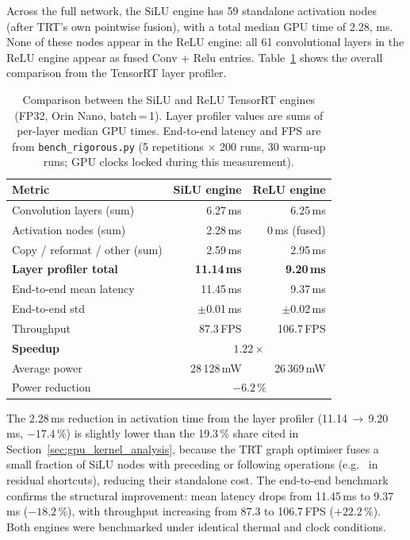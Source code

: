 \documentclass[12pt,a4paper]{report}
\begin{document}
\noindent Across the full network, the SiLU engine has 59 standalone activation nodes
(after TRT's own pointwise fusion), with a total median GPU time of 2.28, ms.
None of these nodes appear in the ReLU engine: all 61 convolutional layers in the ReLU
engine appear as fused Conv + Relu entries.
Table~\ref{tab:silu_relu} shows the overall comparison from the TensorRT layer profiler.

\begin{table}[h]
\centering
\caption{Comparison between the SiLU and ReLU TensorRT engines (FP32, Orin Nano,
batch\,=\,1). Layer profiler values are sums of per-layer median GPU times.
End-to-end latency and FPS are from \texttt{bench\_rigorous.py}
(5 repetitions $\times$ 200 runs, 30 warm-up runs;
GPU clocks locked during this measurement).}
\label{tab:silu_relu}
\begin{tabular}{lrr}
\toprule
Metric & SiLU engine & ReLU engine \\
\midrule
Convolution layers (sum)          & 6.27\,ms           & 6.25\,ms          \\
Activation nodes (sum)            & 2.28\,ms           & 0\,ms (fused)     \\
Copy / reformat / other (sum)     & 2.59\,ms           & 2.95\,ms          \\
\midrule
\textbf{Layer profiler total}     & \textbf{11.14\,ms} & \textbf{9.20\,ms} \\
\midrule
End-to-end mean latency           & 11.45\,ms          & 9.37\,ms          \\
End-to-end std                    & $\pm$0.01\,ms      & $\pm$0.02\,ms     \\
Throughput                        & 87.3\,FPS          & 106.7\,FPS        \\
\textbf{Speedup}                  & \multicolumn{2}{c}{$\mathbf{1.22\times}$} \\
\midrule
Average power                     & 28\,128\,mW        & 26\,369\,mW       \\
Power reduction                   & \multicolumn{2}{c}{$-6.2\,\%$}           \\
\bottomrule
\end{tabular}
\end{table}

\noindent The 2.28\,ms reduction in activation time from the layer profiler
(11.14\,$\to$\,9.20\,ms, $-17.4\,\%$) is slightly lower than the 19.3\,\%
share cited in Section~\ref{sec:gpu_kernel_analysis}, because the TRT graph optimiser
fuses a small fraction of SiLU nodes with preceding or following operations
(e.g.\  in residual shortcuts), reducing their standalone cost.
The end-to-end benchmark confirms the structural improvement: mean latency drops from
11.45\,ms to 9.37\,ms ($-18.2\,\%$), with throughput increasing from 87.3 to
106.7\,FPS ($+22.2\,\%$).
Both engines were benchmarked under identical thermal and clock conditions.
\end{document}
